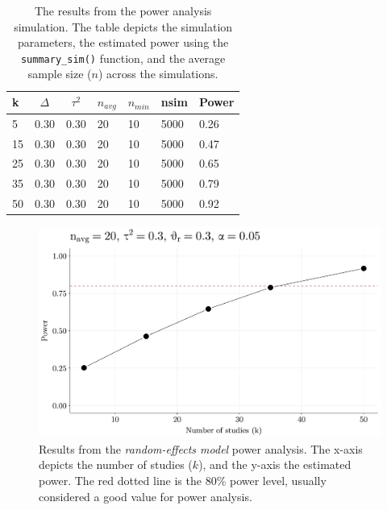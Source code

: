 \documentclass[
  man,floatsintext]{apa6}
\begin{document}
\scriptsize

\begin{table}[H]

\begin{center}
\begin{threeparttable}

\caption{\label{tab:tab-power-analysis-example}The results from the power analysis simulation. The table depicts the simulation parameters, the estimated power using the \texttt{summary\_sim()} function, and the average sample size (\(n\)) across the simulations.}

\small{

\begin{tabular}{lllllll}
\toprule
k & \multicolumn{1}{c}{$\Delta$} & \multicolumn{1}{c}{$\tau^2$} & \multicolumn{1}{c}{$n_{avg}$} & \multicolumn{1}{c}{$n_{min}$} & \multicolumn{1}{c}{nsim} & \multicolumn{1}{c}{Power}\\
\midrule
5 & 0.30 & 0.30 & 20 & 10 & 5000 & 0.26\\
15 & 0.30 & 0.30 & 20 & 10 & 5000 & 0.47\\
25 & 0.30 & 0.30 & 20 & 10 & 5000 & 0.65\\
35 & 0.30 & 0.30 & 20 & 10 & 5000 & 0.79\\
50 & 0.30 & 0.30 & 20 & 10 & 5000 & 0.92\\
\bottomrule
\end{tabular}

}

\end{threeparttable}
\end{center}

\end{table}

\normalsize

\scriptsize

\begin{figure}[H]

{\centering \includegraphics[width=0.8\linewidth]{paper_files/figure-latex/plot-power-analysis-1} 

}

\caption{Results from the \emph{random-effects model} power analysis. The x-axis depicts the number of studies (\(k\)), and the y-axis the estimated power. The red dotted line is the 80\% power level, usually considered a good value for power analysis.}\label{fig:plot-power-analysis}
\end{figure}
\end{document}
